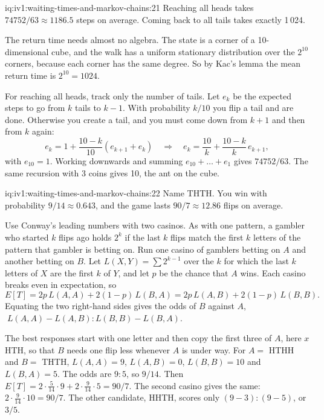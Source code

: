 \begin{solution}{iq:iv1:waiting-times-and-markov-chains:21}
Reaching all heads takes $74752/63 \approx 1186.5$ steps on average. Coming back to all tails takes exactly 1\,024.

The return time needs almost no algebra. The state is a corner of a 10-dimensional cube, and the walk has a uniform stationary distribution over the $2^{10}$ corners, because each corner has the same degree. So by Kac's lemma the mean return time is $2^{10} = 1024$.

For reaching all heads, track only the number of tails. Let $e_k$ be the expected steps to go from $k$ tails to $k - 1$. With probability $k/10$ you flip a tail and are done. Otherwise you create a tail, and you must come down from $k + 1$ and then from $k$ again:
\[
e_k = 1 + \frac{10 - k}{10}(e_{k+1} + e_k) \quad\Rightarrow\quad e_k = \frac{10}{k} + \frac{10 - k}{k}\,e_{k+1},
\]
with $e_{10} = 1$. Working downwards and summing $e_{10} + \dots + e_1$ gives $74752/63$. The same recursion with 3 coins gives 10, the ant on the cube.

\end{solution}

\begin{solution}{iq:iv1:waiting-times-and-markov-chains:22}
Name THTH. You win with probability $9/14 \approx 0.643$, and the game lasts $90/7 \approx 12.86$ flips on average.

Use Conway's leading numbers with two casinos. As with one pattern, a gambler who started $k$ flips ago holds $2^k$ if the last $k$ flips match the first $k$ letters of the pattern that gambler is betting on. Run one casino of gamblers betting on $A$ and another betting on $B$. Let $L(X, Y) = \sum 2^{k-1}$ over the $k$ for which the last $k$ letters of $X$ are the first $k$ of $Y$, and let $p$ be the chance that $A$ wins. Each casino breaks even in expectation, so
\[
E[T] = 2p\,L(A,A) + 2(1-p)\,L(B,A) = 2p\,L(A,B) + 2(1-p)\,L(B,B).
\]
Equating the two right-hand sides gives the odds of $B$ against $A$, $\;L(A,A) - L(A,B) : L(B,B) - L(B,A)$.

The best responses start with one letter and then copy the first three of $A$, here $x$HTH, so that $B$ needs one flip less whenever $A$ is under way. For $A = $ HTHH and $B = $ THTH, $L(A,A) = 9$, $L(A,B) = 0$, $L(B,B) = 10$ and $L(B,A) = 5$. The odds are $9:5$, so $9/14$. Then $E[T] = 2 \cdot \tfrac{5}{14} \cdot 9 + 2 \cdot \tfrac{9}{14} \cdot 5 = 90/7$. The second casino gives the same: $2 \cdot \tfrac{9}{14} \cdot 10 = 90/7$. The other candidate, HHTH, scores only $(9-3):(9-5)$, or $3/5$.

\end{solution}

